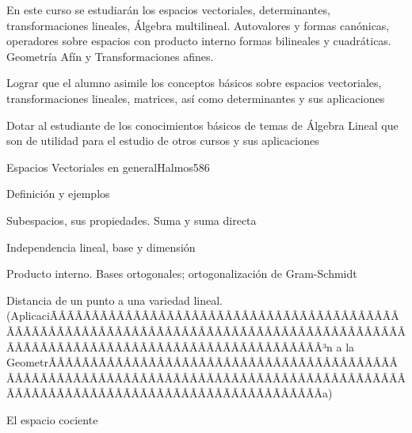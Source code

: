 \begin{sumilla}


\begin{fundamentacion}
En este curso se estudiar\'an los espacios vectoriales, determinantes, transformaciones lineales, \'Algebra multilineal.
Autovalores y formas can\'onicas, operadores sobre espacios con producto interno formas bilineales y cuadr\'aticas. Geometr\'ia Af\'in y Transformaciones afines.
\end{fundamentacion}

\begin{objetivosdelcurso}
\item  Lograr que el alumno asimile los conceptos b\'asicos sobre espacios vectoriales, transformaciones lineales, matrices, as\'i como determinantes y sus aplicaciones
\item  Dotar al estudiante de los conocimientos b\'asicos de temas de \'Algebra Lineal que son de utilidad para el estudio de otros cursos y sus aplicaciones
\end{objetivosdelcurso}

\begin{outcomes}
\end{outcomes}

\begin{unit}{Espacios Vectoriales en general}{Halmos58}{6}
   \begin{topicos}
         \item  Definici\'on y ejemplos
	 \item  Subespacios, sus propiedades. Suma y suma directa
         \item  Independencia lineal, base y dimensi\'on
	 \item  Producto interno. Bases ortogonales; ortogonalizaci\'on de Gram-Schmidt
         \item  Distancia de un punto a una variedad lineal. (AplicaciÃÂÃÂÃÂÃÂÃÂÃÂÃÂÃÂÃÂÃÂÃÂÃÂÃÂÃÂÃÂÃÂÃÂÃÂÃÂÃÂÃÂÃÂÃÂÃÂÃÂÃÂÃÂÃÂÃÂÃÂÃÂÃÂÃÂÃÂÃÂÃÂÃÂÃÂÃÂÃÂÃÂÃÂÃÂÃÂÃÂÃÂÃÂÃÂÃÂÃÂÃÂÃÂÃÂÃÂÃÂÃÂÃÂÃÂÃÂÃÂÃÂÃÂÃÂÃÂ³n a la GeometrÃÂÃÂÃÂÃÂÃÂÃÂÃÂÃÂÃÂÃÂÃÂÃÂÃÂÃÂÃÂÃÂÃÂÃÂÃÂÃÂÃÂÃÂÃÂÃÂÃÂÃÂÃÂÃÂÃÂÃÂÃÂÃÂÃÂÃÂÃÂÃÂÃÂÃÂÃÂÃÂÃÂÃÂÃÂÃÂÃÂÃÂÃÂÃÂÃÂÃÂÃÂÃÂÃÂÃÂÃÂÃÂÃÂÃÂÃÂÃÂÃÂÃÂÃÂÃÂ­a)
         \item  El espacio cociente
   \end{topicos}


\end{unit}
\end{sumilla}
